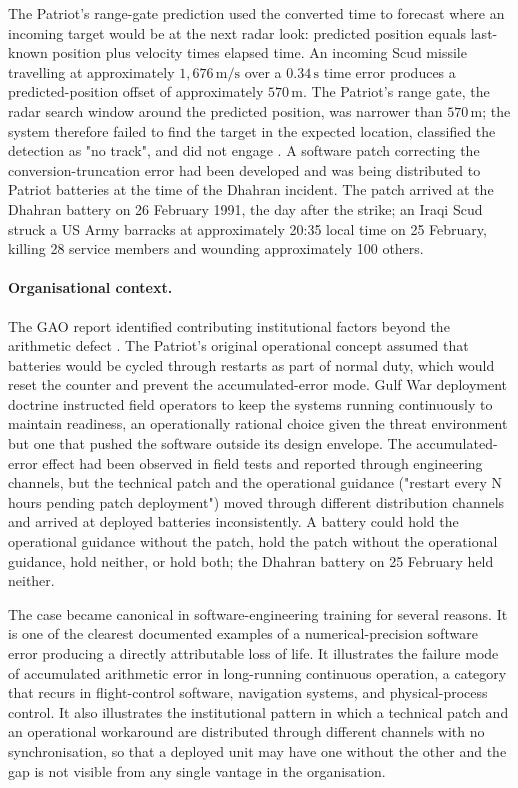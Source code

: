 The Patriot's range-gate prediction used the converted time to
forecast where an incoming target would be at the next radar
look: predicted position equals last-known position plus velocity
times elapsed time. An incoming Scud missile travelling at
approximately $1{,}676 \,\si{\meter\per\second}$ over a
$0.34 \,\si{\second}$ time error produces a predicted-position
offset of approximately $570 \,\si{\meter}$. The Patriot's range
gate, the radar search window around the predicted position, was
narrower than $570 \,\si{\meter}$; the system therefore failed to
find the target in the expected location, classified the
detection as "no track", and did not engage \cite{acc:gao-patriot-1992}.
A software patch correcting the conversion-truncation error had
been developed and was being distributed to Patriot batteries at
the time of the Dhahran incident. The patch arrived at the
Dhahran battery on 26 February 1991, the day after the strike;
an Iraqi Scud struck a US Army barracks at approximately 20:35
local time on 25 February, killing 28 service members and wounding
approximately 100 others.

\paragraph{Organisational context.}
The GAO report identified contributing institutional factors
beyond the arithmetic defect \cite{acc:gao-patriot-1992}. The
Patriot's original operational concept assumed that batteries
would be cycled through restarts as part of normal duty, which
would reset the counter and prevent the accumulated-error mode.
Gulf War deployment doctrine instructed field operators to keep
the systems running continuously to maintain readiness, an
operationally rational choice given the threat environment but
one that pushed the software outside its design envelope. The
accumulated-error effect had been observed in field tests and
reported through engineering channels, but the technical patch
and the operational guidance ("restart every N hours pending
patch deployment") moved through different distribution channels
and arrived at deployed batteries inconsistently. A battery could
hold the operational guidance without the patch, hold the patch
without the operational guidance, hold neither, or hold both;
the Dhahran battery on 25 February held neither.

The case became canonical in software-engineering training for
several reasons. It is one of the clearest documented examples of
a numerical-precision software error producing a directly
attributable loss of life. It illustrates the failure mode of
accumulated arithmetic error in long-running continuous operation,
a category that recurs in flight-control software, navigation
systems, and physical-process control. It also illustrates the
institutional pattern in which a technical patch and an operational
workaround are distributed through different channels with no
synchronisation, so that a deployed unit may have one without the
other and the gap is not visible from any single vantage in the
organisation.

